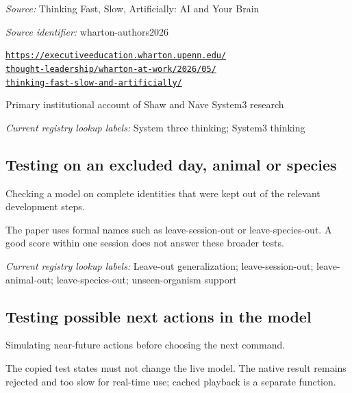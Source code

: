 \noindent\textit{Source:} Thinking Fast, Slow, Artificially: AI and Your Brain\par
\noindent\textit{Source identifier:} wharton-authors2026\par
\noindent\href{https://executiveeducation.wharton.upenn.edu/thought-leadership/wharton-at-work/2026/05/thinking-fast-slow-and-artificially/}{\nolinkurl{https://executiveeducation.wharton.upenn.edu/}}\\
\href{https://executiveeducation.wharton.upenn.edu/thought-leadership/wharton-at-work/2026/05/thinking-fast-slow-and-artificially/}{\nolinkurl{thought-leadership/wharton-at-work/2026/05/}}\\
\href{https://executiveeducation.wharton.upenn.edu/thought-leadership/wharton-at-work/2026/05/thinking-fast-slow-and-artificially/}{\nolinkurl{thinking-fast-slow-and-artificially/}}\par
\noindent Primary institutional account of Shaw and Nave System3 research\par


\noindent\textit{Current registry lookup labels:} System three thinking; System3 thinking\par

\begin{samepage}
\subsection*{Testing on an excluded day, animal or species}
\noindent Checking a model on complete identities that were kept out of the relevant development steps.\par
\end{samepage}
\begin{samepage}
\noindent The paper uses formal names such as leave-session-out or leave-species-out. A good score within one session does not answer these broader tests.\par\nopagebreak[4]

\end{samepage}


\noindent\textit{Current registry lookup labels:} Leave-out generalization; leave-session-out; leave-animal-out; leave-species-out; unseen-organism support\par

\begin{samepage}
\subsection*{Testing possible next actions in the model}
\noindent Simulating near-future actions before choosing the next command.\par
\end{samepage}
\begin{samepage}
\noindent The copied test states must not change the live model. The native result remains rejected and too slow for real-time use; cached playback is a separate function.\par\nopagebreak[4]

\end{samepage}


